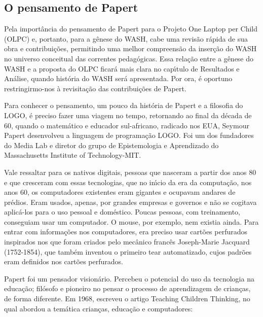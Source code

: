 \documentclass[
12pt,		%
openright,	%
twoside,  %
a4paper,			%
chapter=TITLE,		%
english,			%
french,				%
spanish,			%
brazil				%
]{USPSC-classe/USPSC}
\begin{document}
\subsection[O pensamento de Papert]{O pensamento de Papert}\label{O pensamento de Papert}
Pela import\^ancia do pensamento de Papert para o Projeto One Laptop per Child (OLPC) e, portanto, para a g\^enese do WASH, cabe uma revis\~ao r\'apida de sua obra e contribui\c{c}\~oes, permitindo uma melhor compreens\~ao da inser\c{c}\~ao do WASH no universo conceitual das correntes pedag\'ogicas. Essa rela\c{c}\~ao entre a g\^enese do WASH e a proposta do OLPC ficar\'a mais clara no cap\'{\i}tulo de Resultados e An\'alise, quando hist\'oria do WASH ser\'a apresentada. Por ora, \'e oportuno restringirmo-nos \`a revisita\c{c}\~ao das contribui\c{c}\~oes de Papert.


Para conhecer  o pensamento, um pouco da hist\'oria de Papert e  a filosofia do LOGO, \'e preciso fazer uma viagem no tempo, retornando ao final da d\'ecada de 60, quando o matem\'atico e educador sul-africano, radicado nos EUA, Seymour Papert desenvolveu a linguagem   de programa\c{c}\~ao LOGO.  Foi um dos fundadores do Media Lab e diretor do grupo de Epistemologia e Aprendizado do Massachusetts Institute of Technology-MIT.


Vale ressaltar para os nativos digitais, pessoas que nasceram a partir dos anos 80 e que cresceram com essas tecnologias, que no in\'{\i}cio da era da computa\c{c}\~ao, nos anos 60, os computadores existentes eram gigantes e ocupavam andares de pr\'edios. Eram usados, apenas, por grandes empresas e governos e n\~ao se cogitava aplic\'a-los para o uso pessoal e dom\'estico. Poucas pessoas, com treinamento, conseguiam usar um computador. O mouse, por exemplo, nem existia ainda. Para entrar com informa\c{c}\~oes nos computadores, era preciso usar cart\~oes perfurados inspirados nos que foram criados pelo mec\^anico franc\^es Joseph-Marie Jacquard (1752-1854), que tamb\'em inventou o primeiro tear automatizado, cujos padr\~oes eram definidos nos cart\~oes perfurados.


Papert foi um pensador vision\'ario. Percebeu o potencial do uso da tecnologia na educa\c{c}\~ao; fil\'osofo e pioneiro no pensar o processo de aprendizagem de crian\c{c}as, de forma diferente. Em 1968, escreveu o artigo \textquotedbl Teaching Children Thinking\textquotedbl , no qual abordou a tem\'atica crian\c{c}as, educa\c{c}\~ao e computadores:



\noindent\begin{center}\mbox{\centering{}}\end{center}
\end{document}
